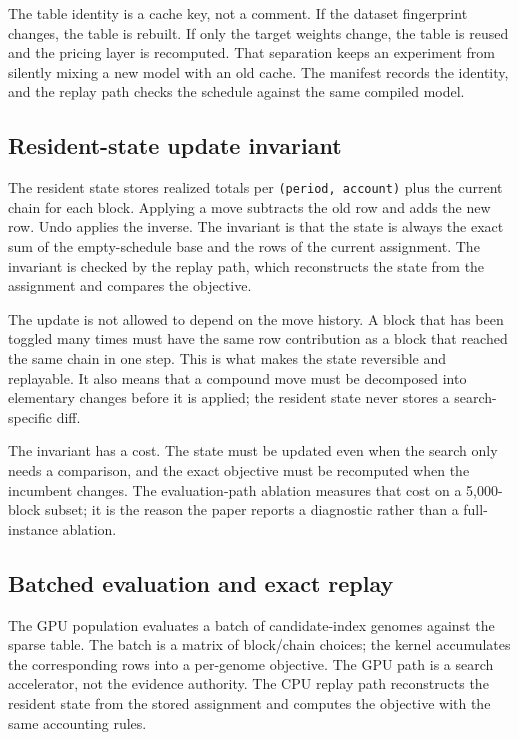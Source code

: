 \documentclass[preprint,11pt]{elsarticle}
\begin{document}
The table identity is a cache key, not a comment. If the dataset fingerprint changes, the table is
rebuilt. If only the target weights change, the table is reused and the pricing layer is recomputed.
That separation keeps an experiment from silently mixing a new model with an old cache. The manifest
records the identity, and the replay path checks the schedule against the same compiled model.

\subsection{Resident-state update invariant}

The resident state stores realized totals per \texttt{(period, account)} plus the current chain for
each block. Applying a move subtracts the old row and adds the new row. Undo applies the inverse. The
invariant is that the state is always the exact sum of the empty-schedule base and the rows of the
current assignment. The invariant is checked by the replay path, which reconstructs the state from the
assignment and compares the objective.

The update is not allowed to depend on the move history. A block that has been toggled many times must
have the same row contribution as a block that reached the same chain in one step. This is what makes
the state reversible and replayable. It also means that a compound move must be decomposed into
elementary changes before it is applied; the resident state never stores a search-specific diff.

The invariant has a cost. The state must be updated even when the search only needs a comparison, and
the exact objective must be recomputed when the incumbent changes. The evaluation-path ablation
measures that cost on a 5,000-block subset; it is the reason the paper reports a diagnostic rather
than a full-instance ablation.

\subsection{Batched evaluation and exact replay}

The GPU population evaluates a batch of candidate-index genomes against the sparse table. The batch is
a matrix of block/chain choices; the kernel accumulates the corresponding rows into a per-genome
objective. The GPU path is a search accelerator, not the evidence authority. The CPU replay path
reconstructs the resident state from the stored assignment and computes the objective with the same
accounting rules.
\end{document}
